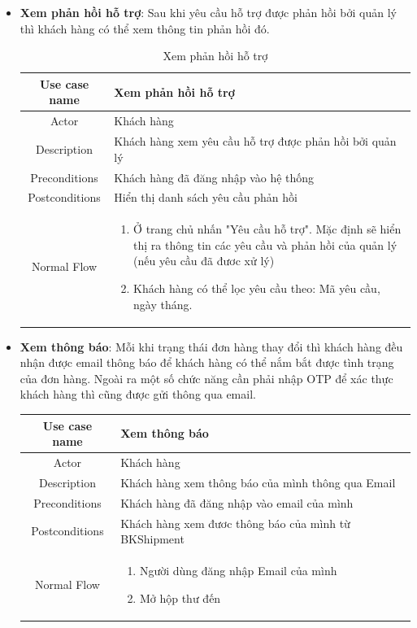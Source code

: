 \begin{itemize}
\begin{itemize}
			\item \textbf{Xem phản hồi hỗ trợ}: Sau khi yêu cầu hỗ trợ được phản hồi bởi quản lý thì khách hàng có thể xem thông tin phản hồi đó.
			
			\begin{table}[H]
				\centering\begin{tabular}{|c|m{25em}|}
					\hline 
					Use case name & Xem phản hồi hỗ trợ\\ 
					\hline 
					Actor & Khách hàng \\ 
					\hline
					Description & Khách hàng xem yêu cầu hỗ trợ được phản hồi bởi quản lý \\
					\hline 
					Preconditions & Khách hàng đã đăng nhập vào hệ thống \\
					\hline
					Postconditions & Hiển thị danh sách yêu cầu phản hồi \\
					\hline
					Normal Flow & \begin{enumerate}
						\item Ở trang chủ nhấn "Yêu cầu hỗ trợ". Mặc định sẽ hiển thị ra thông tin các yêu cầu và phản hồi của quản lý (nếu yêu cầu đã đươc xử lý)
						\item Khách hàng có thể lọc yêu cầu theo: Mã yêu cầu, ngày tháng.
				
					\end{enumerate}
					\\
					\hline
				\end{tabular}
				\caption{Xem phản hồi hỗ trợ}
			\end{table}
			
			\item \textbf{Xem thông báo}: Mỗi khi trạng thái đơn hàng thay đổi thì khách hàng đều nhận được email thông báo để khách hàng có thể nắm bắt được tình trạng của đơn hàng. Ngoài ra một số chức năng cần phải nhập OTP để xác thực khách hàng thì cũng được gửi thông qua email.
			
			\begin{table}[H]
				\centering\begin{tabular}{|c|m{25em}|}
					\hline 
					Use case name & Xem thông báo\\ 
					\hline 
					Actor & Khách hàng \\ 
					\hline
					Description & Khách hàng xem thông báo của mình thông qua Email \\
					\hline 
					Preconditions & Khách hàng đã đăng nhập vào email của mình \\
					\hline
					Postconditions & Khách hàng xem đươc thông báo của mình từ BKShipment \\
					\hline
					Normal Flow & \begin{enumerate}
						\item Người dùng đăng nhập Email của mình
						\item Mở hộp thư đến
						

\end{enumerate}
\end{tabular}
\end{table}
\end{itemize}
\end{itemize}
